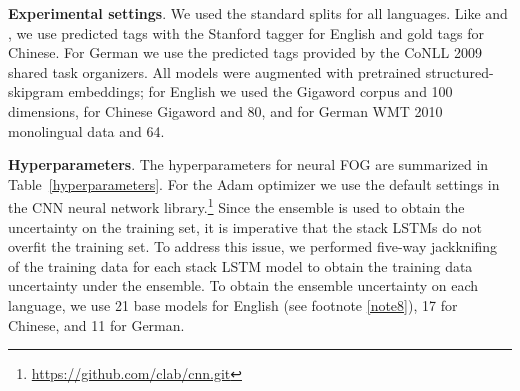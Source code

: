 \documentclass[11pt,letterpaper]{article}
\newcommand{\ignore}[1]{}
\newcommand{\adhicomment}[1]{\ignore{\textcolor{green}{{\textbf{[#1 --\textsc{adhi}]}}}}}
\newcommand{\lingpengcomment}[1]{\ignore{\textcolor{green}{{\textbf{[#1 --\textsc{lpk}]}}}}}
\newcommand{\cjd}[1]{\textcolor{cyan}{\ignore{{\textbf{[#1 --\textsc{cjd}]}}}}}
\newcommand{\nascomment}[1]{\ignore{\textcolor{blue}{{\textbf{[#1 --\textsc{nas}]}}}}}
\newcommand{\miguelcomment}[1]{\ignore{\textcolor{red}{{\textbf{[#1 --\textsc{miguel}]}}}}}
\begin{document}
\textbf{Experimental settings}. We used the standard splits for all languages.  Like  and , we use predicted tags with the Stanford tagger \cite{stanford_tagger} for English and gold tags for Chinese. For German we use the predicted tags provided by the CoNLL 2009 shared task organizers. All models were augmented with pretrained structured-skipgram \ignore{\nascomment{better to call this ``structured-skipgram''?  since w2v is a package, not a model}}\cite{wang2vec} embeddings;
for English we used the Gigaword corpus and 100 dimensions, for Chinese Gigaword and 80, and for German WMT 2010 monolingual data and 64.


\textbf{Hyperparameters}. The hyperparameters for neural FOG are summarized in Table~\ref{hyperparameters}. For the Adam optimizer we use the default settings in the CNN neural network library.\footnote{\url{https://github.com/clab/cnn.git}} Since the ensemble is used to obtain the uncertainty on the training set, it is imperative that the stack LSTMs do not overfit the training set. To address this issue, we performed  five-way jackknifing of the training data for each stack LSTM model to obtain the training data uncertainty under the ensemble.\ignore{\nascomment{this doesn't make sense ... uncertainty for each stack LSTM? huh?}} To obtain the ensemble uncertainty on each language, we use 21 base models for English (see footnote \ref{note8}),\ignore{\lingpengcomment{here is 21 again, the intro is 20}\adhicomment{This is because the ensemble and the ensemble-jackknifing models are different. That's why we don't have results for Chinese and German.}\miguelcomment{...the reviewers are going to wonder the same, we need to explain it.}\adhicomment{Addressed with a footnote.}} 17 for Chinese, and 11 for German.\ignore{\cjd{I agree with Noah's objection. Maybe say something like since we want to decode the training data with the ensemble, we use 5-way jackknifing to avoid overfitting the transition-based parsers in the ensemble.}\adhicomment{Addressed}} \begin{table}[]
\centering
{}
\end{table}
\end{document}
